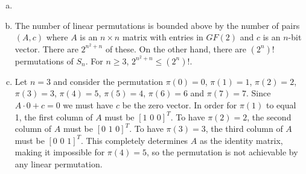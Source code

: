 \documentclass{article}
\begin{document}
\begin{enumerate}[a.]
\item %

\item The number of linear permutations is bounded above by the number of pairs $(A,c)$ where $A$ is an $n \times n$ matrix with entries in $GF(2)$ and $c$ is an $n$-bit vector.  There are $2^{n^2+n}$ of these.  On the other hand, there are $(2^n)!$ permutations of $S_n$.  For $n \geq 3$, $2^{n^2+n} \leq (2^n)!$.  

\item Let $n=3$ and consider the permutation $\pi(0) = 0$, $\pi(1)=1$, $\pi(2)=2$, $\pi(3)=3$, $\pi(4) = 5$, $\pi(5)=4$, $\pi(6)=6$ and $\pi(7) = 7$.  Since $A\cdot0 + c=0$ we must have $c$ be the zero vector.  In order for $\pi(1)$ to equal 1, the first column of $A$ must be $[1\,\, 0\,\,0]^T$.  To have $\pi(2)=2$, the second column of $A$ must be $[0 \,\, 1\,\,0]^T$.  To have $\pi(3)=3$, the third column of $A$ must be $[0\,\, 0\,\, 1]^T$.  This completely determines $A$ as the identity matrix, making it impossible for $\pi(4)=5$, so the permutation is not achievable by any linear permutation. 

\end{enumerate}
\end{document}
